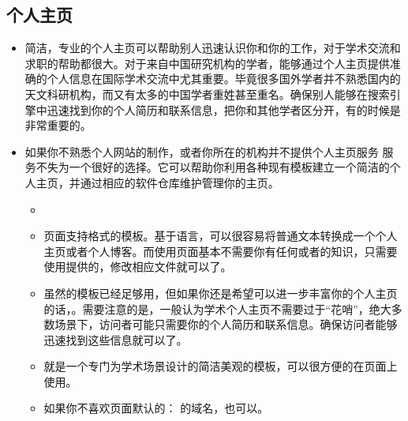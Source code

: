 \documentclass[letterpaper,10pt,english]{sphinxmanual}
\begin{document}
\subsection{个人主页}
\label{\detokenize{resource/research/getting_started_cn:id19}}\begin{itemize}
\item {} 
简洁，专业的个人主页可以帮助别人迅速认识你和你的工作，对于学术交流和求职的帮助都很大。对于来自中国研究机构的学者，能够通过个人主页提供准确的个人信息在国际学术交流中尤其重要。毕竟很多国外学者并不熟悉国内的天文科研机构，而又有太多的中国学者重姓甚至重名。确保别人能够在搜索引擎中迅速找到你的个人简历和联系信息，把你和其他学者区分开，有的时候是非常重要的。

\item {} 
如果你不熟悉个人网站的制作，或者你所在的机构并不提供个人主页服务
服务不失为一个很好的选择。它可以帮助你利用各种现有模板建立一个简洁的个人主页，并通过相应的软件仓库维护管理你的主页。
\begin{itemize}
\item {} 

\item {} 
页面支持格式的模板。基于语言，可以很容易将普通文本转换成一个个人主页或者个人博客。而使用页面基本不需要你有任何或者的知识，只需要使用提供的，修改相应文件就可以了。

\item {} 
虽然的模板已经足够用，但如果你还是希望可以进一步丰富你的个人主页的话，。需要注意的是，一般认为学术个人主页不需要过于“花哨”，绝大多数场景下，访问者可能只需要你的个人简历和联系信息。确保访问者能够迅速找到这些信息就可以了。

\item {} 
就是一个专门为学术场景设计的简洁美观的模板，可以很方便的在页面上使用。

\item {} 
如果你不喜欢页面默认的：
的域名，也可以。


\end{itemize}
\end{itemize}
\end{document}
